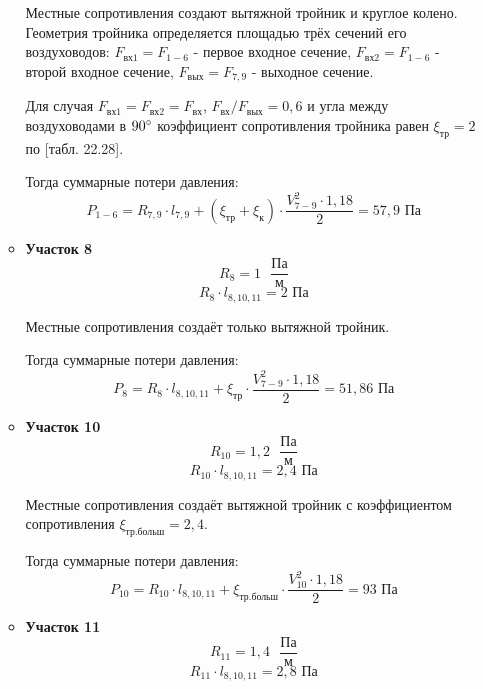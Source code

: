 \begin{enumerate}
\begin{itemize}
                    Местные сопротивления создают вытяжной тройник и круглое колено.
                    Геометрия тройника определяется площадью трёх сечений его воздуховодов:
                    $F_\text{вх1} = F_{1-6}$ - первое входное сечение,
                    $F_\text{вх2} = F_{1-6}$ - второй входное сечение,
                    $F_\text{вых} = F_{7,9}$ - выходное сечение.

                    Для случая $F_\text{вх1} = F_\text{вх2} = F_\text{вх}$,
                    $F_\text{вх} / F_\text{вых} = 0,6$ и угла между воздуховодами
                    в $90 \degree$ коэффициент сопротивления
                    тройника равен $\xi_\text{тр} = 2$ по
                    \cite{air_ventilation_and_conditioning}[табл. 22.28].

                    Тогда суммарные потери давления:
                    $$
                        P_{1-6} = R_{7,9} \cdot l_{7,9}
                                    + (\xi_\text{тр} + \xi_\text{к}) \cdot \frac{V_{7-9}^2 \cdot 1,18}{2}
                                = 57,9 \text{ Па}
                    $$

            \item   \textbf{Участок 8}
                    $$
                        R_{8} = 1 \text{ }\frac{\text{Па}}{\text{м}}
                    $$
                    $$
                        R_{8} \cdot l_{8,10,11} = 2 \text{ Па}
                    $$

                    Местные сопротивления создаёт только вытяжной тройник.

                    Тогда суммарные потери давления:
                    $$
                        P_{8} = R_{8} \cdot l_{8,10,11}
                                    + \xi_\text{тр} \cdot \frac{V_{7-9}^2 \cdot 1,18}{2}
                                = 51,86 \text{ Па}
                    $$

            \item   \textbf{Участок 10}
                    $$
                        R_{10} = 1,2 \text{ }\frac{\text{Па}}{\text{м}}
                    $$
                    $$
                        R_{10} \cdot l_{8,10,11} = 2,4 \text{ Па}
                    $$

                    Местные сопротивления создаёт вытяжной тройник с коэффициентом
                    сопротивления $\xi_\text{тр.больш} = 2,4$.

                    Тогда суммарные потери давления:
                    $$
                        P_{10} = R_{10} \cdot l_{8,10,11}
                                    + \xi_\text{тр.больш} \cdot \frac{V_{10}^2 \cdot 1,18}{2}
                                = 93 \text{ Па}
                    $$
            \item   \textbf{Участок 11}
                    $$
                        R_{11} = 1,4 \text{ }\frac{\text{Па}}{\text{м}}
                    $$
                    $$
                        R_{11} \cdot l_{8,10,11} = 2,8 \text{ Па}
                    $$


\end{itemize}
\end{enumerate}

